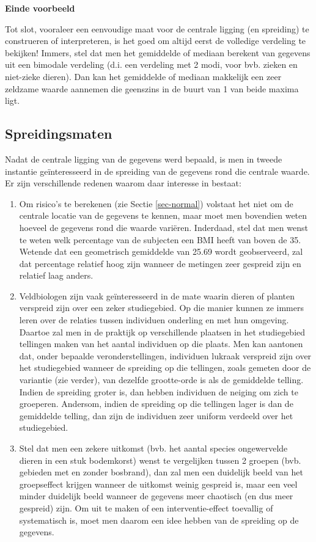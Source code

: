 \documentclass[
  dutch,
  letterpaper,
  12pt]{book}
\providecommand{\tightlist}{%
  \setlength{\itemsep}{0pt}\setlength{\parskip}{0pt}}
\theoremstyle{definition}
\theoremstyle{definition}
\theoremstyle{definition}
\theoremstyle{remark}
\begin{document}
\textbf{Einde voorbeeld}

Tot slot, vooraleer een eenvoudige maat voor de centrale ligging (en
spreiding) te construeren of interpreteren, is het goed om altijd eerst
de volledige verdeling te bekijken! Immers, stel dat men het gemiddelde
of mediaan berekent van gegevens uit een bimodale verdeling (d.i. een
verdeling met 2 modi, voor bvb. zieken en niet-zieke dieren). Dan kan
het gemiddelde of mediaan makkelijk een zeer zeldzame waarde aannemen
die geenszins in de buurt van 1 van beide maxima ligt.

\subsection{Spreidingsmaten}\label{sec-spreiding}

Nadat de centrale ligging van de gegevens werd bepaald, is men in tweede
instantie geïnteresseerd in de spreiding van de gegevens rond die
centrale waarde. Er zijn verschillende redenen waarom daar interesse in
bestaat:

\begin{enumerate}
\def\labelenumi{\arabic{enumi}.}
\tightlist
\item
  Om risico's te berekenen (zie Sectie \ref{sec-normal}) volstaat het
  niet om de centrale locatie van de gegevens te kennen, maar moet men
  bovendien weten hoeveel de gegevens rond die waarde variëren.
  Inderdaad, stel dat men wenst te weten welk percentage van de
  subjecten een BMI heeft van boven de 35. Wetende dat een geometrisch
  gemiddelde van 25.69 wordt geobserveerd, zal dat percentage relatief
  hoog zijn wanneer de metingen zeer gespreid zijn en relatief laag
  anders.
\item
  Veldbiologen zijn vaak geïnteresseerd in de mate waarin dieren of
  planten verspreid zijn over een zeker studiegebied. Op die manier
  kunnen ze immers leren over de relaties tussen individuen onderling en
  met hun omgeving. Daartoe zal men in de praktijk op verschillende
  plaatsen in het studiegebied tellingen maken van het aantal individuen
  op die plaats. Men kan aantonen dat, onder bepaalde
  veronderstellingen, individuen lukraak verspreid zijn over het
  studiegebied wanneer de spreiding op die tellingen, zoals gemeten door
  de variantie (zie verder), van dezelfde grootte-orde is als de
  gemiddelde telling. Indien de spreiding groter is, dan hebben
  individuen de neiging om zich te groeperen. Andersom, indien de
  spreiding op die tellingen lager is dan de gemiddelde telling, dan
  zijn de individuen zeer uniform verdeeld over het studiegebied.
\item
  Stel dat men een zekere uitkomst (bvb. het aantal species ongewervelde
  dieren in een stuk bodemkorst) wenst te vergelijken tussen 2 groepen
  (bvb. gebieden met en zonder bosbrand), dan zal men een duidelijk
  beeld van het groepseffect krijgen wanneer de uitkomst weinig gespreid
  is, maar een veel minder duidelijk beeld wanneer de gegevens meer
  chaotisch (en dus meer gespreid) zijn. Om uit te maken of een
  interventie-effect toevallig of systematisch is, moet men daarom een
  idee hebben van de spreiding op de gegevens.
\end{enumerate}
\end{document}

